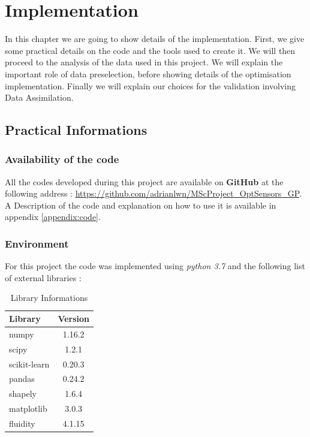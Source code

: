 \chapter{Implementation}


In this chapter we are going to show details of the implementation. First, we give some practical details on the code and the tools used to create it.  We will then proceed to the analysis of the data used in this project. We will explain the important role of data preselection, before showing details of the optimisation implementation. Finally we will explain our choices for the validation involving Data Assimilation. 

\section{Practical Informations}


\subsection{Availability of the code}

All the codes developed during this project are available on \textbf{GitHub} at the following address : \url{https://github.com/adrianlwn/MScProject\_OptSensors\_GP}. A Description of the code and explanation on how to use it is available in appendix \ref{appendix:code}. 


\subsection{Environment}

For this project the code was implemented using \textit{python 3.7} and the following list of external libraries : 

\begin{table}[h!]
\centering
\begin{tabular}{l|c}
\toprule
Library & Version \\ \midrule
numpy & 1.16.2 \\
scipy & 1.2.1\\
scikit-learn & 0.20.3 \\
pandas & 0.24.2 \\
shapely & 1.6.4 \\
matplotlib & 3.0.3\\ 
fluidity & 4.1.15 \\
\bottomrule

\end{tabular}
\caption{Library Informations}
\end{table}


